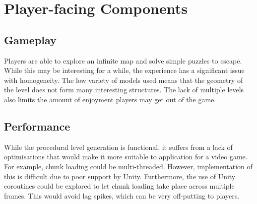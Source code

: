 \section{Player-facing Components}
\subsection{Gameplay}
Players are able to explore an infinite map and solve simple puzzles to escape. While this may be interesting for a while, the experience has a significant issue with homogeneity. The low variety of models used means that the geometry of the level does not form many interesting structures. The lack of multiple levels also limits the amount of enjoyment players may get out of the game.

\subsection{Performance}
While the procedural level generation is functional, it suffers from a lack of optimisations that would make it more suitable to application for a video game. For example, chunk loading could be multi-threaded. However, implementation of this is difficult due to poor support by Unity. Furthermore, the use of Unity coroutines could be explored to let chunk loading take place across multiple frames. This would avoid lag spikes, which can be very off-putting to players.